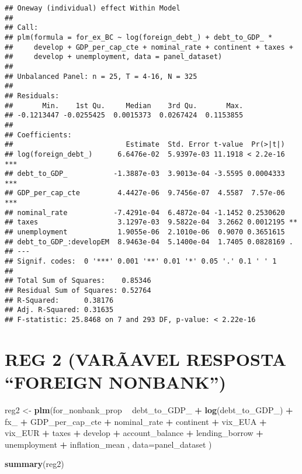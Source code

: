 \documentclass[]{article}
\newenvironment{Shaded}{\begin{snugshade}}{\end{snugshade}}
\newcommand{\KeywordTok}[1]{\textcolor[rgb]{0.13,0.29,0.53}{\textbf{#1}}}
\newcommand{\DataTypeTok}[1]{\textcolor[rgb]{0.13,0.29,0.53}{#1}}
\newcommand{\StringTok}[1]{\textcolor[rgb]{0.31,0.60,0.02}{#1}}
\newcommand{\OperatorTok}[1]{\textcolor[rgb]{0.81,0.36,0.00}{\textbf{#1}}}
\newcommand{\NormalTok}[1]{#1}
\begin{document}
\begin{verbatim}
## Oneway (individual) effect Within Model
## 
## Call:
## plm(formula = for_ex_BC ~ log(foreign_debt_) + debt_to_GDP_ * 
##     develop + GDP_per_cap_cte + nominal_rate + continent + taxes + 
##     develop + unemployment, data = panel_dataset)
## 
## Unbalanced Panel: n = 25, T = 4-16, N = 325
## 
## Residuals:
##       Min.    1st Qu.     Median    3rd Qu.       Max. 
## -0.1213447 -0.0255425  0.0015373  0.0267424  0.1153855 
## 
## Coefficients:
##                           Estimate  Std. Error t-value  Pr(>|t|)    
## log(foreign_debt_)      6.6476e-02  5.9397e-03 11.1918 < 2.2e-16 ***
## debt_to_GDP_           -1.3887e-03  3.9013e-04 -3.5595 0.0004333 ***
## GDP_per_cap_cte         4.4427e-06  9.7456e-07  4.5587  7.57e-06 ***
## nominal_rate           -7.4291e-04  6.4872e-04 -1.1452 0.2530620    
## taxes                   3.1297e-03  9.5822e-04  3.2662 0.0012195 ** 
## unemployment            1.9055e-06  2.1010e-06  0.9070 0.3651615    
## debt_to_GDP_:developEM  8.9463e-04  5.1400e-04  1.7405 0.0828169 .  
## ---
## Signif. codes:  0 '***' 0.001 '**' 0.01 '*' 0.05 '.' 0.1 ' ' 1
## 
## Total Sum of Squares:    0.85346
## Residual Sum of Squares: 0.52764
## R-Squared:      0.38176
## Adj. R-Squared: 0.31635
## F-statistic: 25.8468 on 7 and 293 DF, p-value: < 2.22e-16
\end{verbatim}

\section{\texorpdfstring{REG 2 (VARÃAVEL RESPOSTA ``FOREIGN
NONBANK'')}{REG 2 (VARÃAVEL RESPOSTA FOREIGN NONBANK)}}\label{reg-2-varuxe3avel-resposta-foreign-nonbank}

\begin{Shaded}
\begin{Highlighting}[]
\NormalTok{reg2 <-}\StringTok{ }\KeywordTok{plm}\NormalTok{(for_nonbank_prop }\OperatorTok{~}\StringTok{  }\NormalTok{debt_to_GDP_ }\OperatorTok{+}\StringTok{ }\KeywordTok{log}\NormalTok{(debt_to_GDP_) }\OperatorTok{+}\StringTok{ }\NormalTok{fx_ }\OperatorTok{+}\StringTok{ }\NormalTok{GDP_per_cap_cte }\OperatorTok{+}\StringTok{  }\NormalTok{nominal_rate }\OperatorTok{+}\StringTok{ }\NormalTok{continent }\OperatorTok{+}\StringTok{ }\NormalTok{vix_EUA }\OperatorTok{+}\StringTok{ }\NormalTok{vix_EUR }\OperatorTok{+}\StringTok{ }\NormalTok{taxes }\OperatorTok{+}\StringTok{ }\NormalTok{develop }\OperatorTok{+}\StringTok{ }\NormalTok{account_balance }\OperatorTok{+}\StringTok{ }\NormalTok{lending_borrow }\OperatorTok{+}\StringTok{ }\NormalTok{unemployment }\OperatorTok{+}\StringTok{ }\NormalTok{inflation_mean , }\DataTypeTok{data=}\NormalTok{panel_dataset  )}

\KeywordTok{summary}\NormalTok{(reg2)}
\end{Highlighting}
\end{Shaded}
\end{document}
